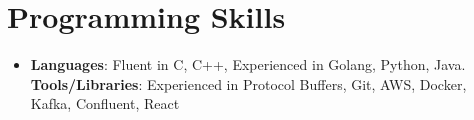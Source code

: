 \documentclass[letterpaper,11pt]{article}
\newcommand{\resumeSubHeadingListStart}{\begin{itemize}[itemsep=0.01pt, leftmargin=*]}
\newcommand{\resumeSubHeadingListEnd}{\end{itemize} \vspace{-8pt}}
\begin{document}
\section{Programming Skills}
 \resumeSubHeadingListStart
   \item[]{
     \textbf{Languages}{: Fluent in C, C++, Experienced in Golang, Python, Java.} \\
     \textbf{Tools/Libraries}{: Experienced in Protocol Buffers, Git, AWS, Docker, Kafka, Confluent, React}
   }
 \resumeSubHeadingListEnd


\end{document}
